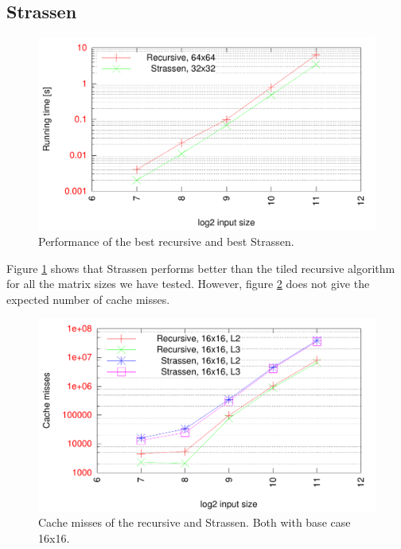 \subsection{Strassen}


\begin{figure}[h!]
  \centering
  \includegraphics[width=\textwidth]{"../project2/gnuplots/recursive_vs_strassen_performance"}
  \caption{Performance of the best recursive and best Strassen.}
  \label{fig:recursive_vs_strassen_performance}
\end{figure}

Figure \ref{fig:recursive_vs_strassen_performance} shows that Strassen performs better than the tiled recursive algorithm for all the matrix sizes we have tested. However, figure \ref{fig:recursive_vs_strassen_cache} does not give the expected number of cache misses. 

\begin{figure}[h!]
  \centering
  \includegraphics[width=\textwidth]{"../project2/gnuplots/recursive_vs_strassen_cache"}
  \caption{Cache misses of the recursive and Strassen. Both with base case 16x16.}
  \label{fig:recursive_vs_strassen_cache}
\end{figure}

